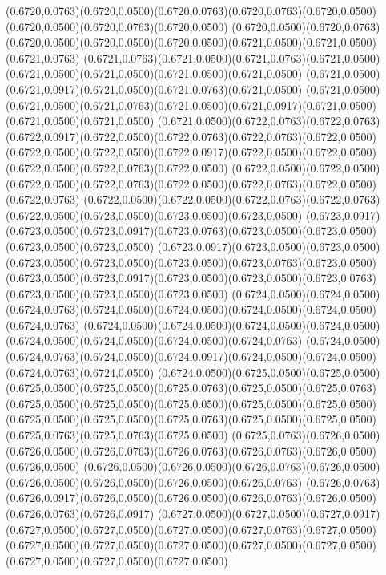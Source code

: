 (0.6720,0.0763)(0.6720,0.0500)(0.6720,0.0763)(0.6720,0.0763)(0.6720,0.0500)(0.6720,0.0500)(0.6720,0.0763)(0.6720,0.0500)
(0.6720,0.0500)(0.6720,0.0763)(0.6720,0.0500)(0.6720,0.0500)(0.6720,0.0500)(0.6721,0.0500)(0.6721,0.0500)(0.6721,0.0763)
(0.6721,0.0763)(0.6721,0.0500)(0.6721,0.0763)(0.6721,0.0500)(0.6721,0.0500)(0.6721,0.0500)(0.6721,0.0500)(0.6721,0.0500)
(0.6721,0.0500)(0.6721,0.0917)(0.6721,0.0500)(0.6721,0.0763)(0.6721,0.0500)
\PST@Solid(0.6721,0.0500)(0.6721,0.0500)(0.6721,0.0763)(0.6721,0.0500)(0.6721,0.0917)(0.6721,0.0500)(0.6721,0.0500)(0.6721,0.0500)
(0.6721,0.0500)(0.6722,0.0763)(0.6722,0.0763)(0.6722,0.0917)(0.6722,0.0500)(0.6722,0.0763)(0.6722,0.0763)(0.6722,0.0500)
(0.6722,0.0500)(0.6722,0.0500)(0.6722,0.0917)(0.6722,0.0500)(0.6722,0.0500)(0.6722,0.0500)(0.6722,0.0763)(0.6722,0.0500)
(0.6722,0.0500)(0.6722,0.0500)(0.6722,0.0500)(0.6722,0.0763)(0.6722,0.0500)(0.6722,0.0763)(0.6722,0.0500)(0.6722,0.0763)
(0.6722,0.0500)(0.6722,0.0500)(0.6722,0.0763)(0.6722,0.0763)(0.6722,0.0500)(0.6723,0.0500)(0.6723,0.0500)(0.6723,0.0500)
(0.6723,0.0917)(0.6723,0.0500)(0.6723,0.0917)(0.6723,0.0763)(0.6723,0.0500)(0.6723,0.0500)(0.6723,0.0500)(0.6723,0.0500)
(0.6723,0.0917)(0.6723,0.0500)(0.6723,0.0500)(0.6723,0.0500)(0.6723,0.0500)(0.6723,0.0500)(0.6723,0.0763)(0.6723,0.0500)
(0.6723,0.0500)(0.6723,0.0917)(0.6723,0.0500)(0.6723,0.0500)(0.6723,0.0763)(0.6723,0.0500)(0.6723,0.0500)(0.6723,0.0500)
(0.6724,0.0500)(0.6724,0.0500)(0.6724,0.0763)(0.6724,0.0500)(0.6724,0.0500)(0.6724,0.0500)(0.6724,0.0500)(0.6724,0.0763)
(0.6724,0.0500)(0.6724,0.0500)(0.6724,0.0500)(0.6724,0.0500)(0.6724,0.0500)(0.6724,0.0500)(0.6724,0.0500)(0.6724,0.0763)
(0.6724,0.0500)(0.6724,0.0763)(0.6724,0.0500)(0.6724,0.0917)(0.6724,0.0500)(0.6724,0.0500)(0.6724,0.0763)(0.6724,0.0500)
(0.6724,0.0500)(0.6725,0.0500)(0.6725,0.0500)(0.6725,0.0500)(0.6725,0.0500)(0.6725,0.0763)(0.6725,0.0500)(0.6725,0.0763)
(0.6725,0.0500)(0.6725,0.0500)(0.6725,0.0500)(0.6725,0.0500)(0.6725,0.0500)
\PST@Solid(0.6725,0.0500)(0.6725,0.0500)(0.6725,0.0763)(0.6725,0.0500)(0.6725,0.0500)(0.6725,0.0763)(0.6725,0.0763)(0.6725,0.0500)
(0.6725,0.0763)(0.6726,0.0500)(0.6726,0.0500)(0.6726,0.0763)(0.6726,0.0763)(0.6726,0.0763)(0.6726,0.0500)(0.6726,0.0500)
(0.6726,0.0500)(0.6726,0.0500)(0.6726,0.0763)(0.6726,0.0500)(0.6726,0.0500)(0.6726,0.0500)(0.6726,0.0500)(0.6726,0.0763)
(0.6726,0.0763)(0.6726,0.0917)(0.6726,0.0500)(0.6726,0.0500)(0.6726,0.0763)(0.6726,0.0500)(0.6726,0.0763)(0.6726,0.0917)
(0.6727,0.0500)(0.6727,0.0500)(0.6727,0.0917)(0.6727,0.0500)(0.6727,0.0500)(0.6727,0.0500)(0.6727,0.0763)(0.6727,0.0500)
(0.6727,0.0500)(0.6727,0.0500)(0.6727,0.0500)(0.6727,0.0500)(0.6727,0.0500)(0.6727,0.0500)(0.6727,0.0500)(0.6727,0.0500)
